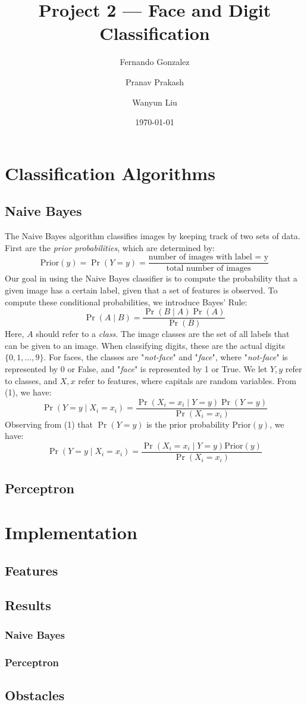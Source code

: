 \documentclass{article}
\title{Project 2 --- Face and Digit Classification}
\author{Fernando Gonzalez}
\author{Pranav Prakash}
\author{Wanyun Liu}
\affil{\textit {\{fdg17, pp618, wl432\}@scarletmail.rutgers.edu}}
\date{\today}
\begin{document}
  \maketitle
  \section{Classification Algorithms}
  \subsection{Naive Bayes}
  The Naive Bayes algorithm classifies images by keeping track of two sets of data.
  First are the {\em prior probabilities}, which are determined by:
  \begin{equation}
  \text{Prior}(y) = \Pr(Y = y) = \frac{\text{number of images with label = y}}{\text{total number of images}}
  \end{equation}
  Our goal in using the Naive Bayes classifier is to compute the probability that a given image has a certain label,
  given that a set of features is observed. To compute these conditional probabilities, we introduce Bayes' Rule:
  \begin{equation}
  \Pr(A \mid B) = \frac{\Pr(B \mid A)\Pr(A)}{\Pr(B)}
  \end{equation}
  Here, $A$ should refer to a {\em class}. The image classes are the set of all labels that can be given to an image.
  When classifying digits, these are the actual digits $\{0, 1, ..., 9\}$. For faces, the classes are "{\em not-face}" and "{\em face}",
  where "{\em not-face}" is represented by 0 or False, and "{\em face}" is represented by 1 or True.
  We let $Y, y$ refer to classes, and $X, x$ refer to features, where capitals are random variables. From (1), we have:
  \begin{equation}
  \Pr(Y = y \mid X_i = x_i) = \frac{\Pr(X_i = x_i \mid Y = y)\Pr(Y = y)}{\Pr(X_i = x_i)}
  \end{equation}
  Observing from (1) that $\Pr(Y = y)$ is the prior probability $\text{Prior}(y)$, we have:
  \begin{equation}
  \Pr(Y = y \mid X_i = x_i) = \frac{\Pr(X_i = x_i \mid Y = y)\text{Prior}(y)}{\Pr(X_i = x_i)}
  \end{equation}
  \subsection{Perceptron}
  \section{Implementation}
  \subsection{Features}
  \subsection{Results}
  \subsubsection{Naive Bayes}
  \subsubsection{Perceptron}
  \subsection{Obstacles}
\end{document}
